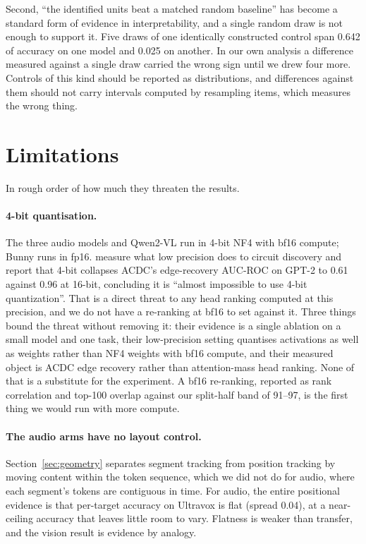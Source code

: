 \documentclass[11pt]{article}
\begin{document}
Second, ``the identified units beat a matched random baseline'' has become a
standard form of evidence in interpretability, and a single random draw is not
enough to support it. Five draws of one identically constructed control span
0.642 of accuracy on one model and 0.025 on another. In our own analysis a
difference measured against a single draw carried the wrong sign until we drew
four more. Controls of this kind should be reported as distributions, and
differences against them should not carry intervals computed by resampling items,
which measures the wrong thing.

\section*{Limitations}
\label{sec:limitations}

In rough order of how much they threaten the results.

\paragraph{4-bit quantisation.} The three
audio models and Qwen2-VL run in 4-bit NF4 with bf16 compute; Bunny runs in
fp16. \citet{pahq2025} measure what low precision does to circuit discovery
and report that 4-bit collapses ACDC's edge-recovery AUC-ROC on GPT-2 to
0.61 against 0.96 at 16-bit, concluding it is ``almost impossible to use 4-bit
quantization''. That is a direct threat to any head ranking computed at this
precision, and we do not have a re-ranking at bf16 to set against it. Three
things bound the threat without removing it: their evidence is a single ablation
on a small model and one task, their low-precision setting quantises activations
as well as weights rather than NF4 weights with bf16 compute, and their measured
object is ACDC edge recovery rather than attention-mass head ranking. None of that is a substitute for
the experiment. A bf16 re-ranking,
reported as rank correlation and top-100 overlap against our split-half band of
91--97, is the first thing we would run with more compute.

\paragraph{The audio arms have no layout control.} Section~\ref{sec:geometry}
separates segment tracking from position tracking by moving content within the
token sequence, which we did not do for audio, where each segment's tokens are
contiguous in time. For audio, the entire
positional evidence is that per-target accuracy on Ultravox is flat (spread 0.04),
at a near-ceiling accuracy that leaves little room to vary. Flatness
is weaker than transfer, and the vision result is evidence by analogy.
\end{document}
